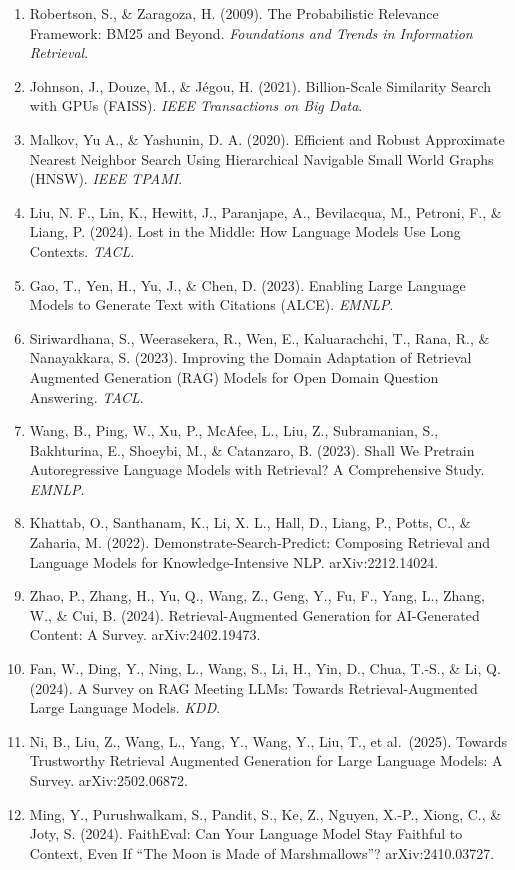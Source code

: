 \begin{enumerate}
\item
  Robertson, S., \& Zaragoza, H. (2009). The Probabilistic Relevance Framework: BM25 and Beyond. \emph{Foundations and Trends in Information Retrieval}.
\item
  Johnson, J., Douze, M., \& Jégou, H. (2021). Billion-Scale Similarity Search with GPUs (FAISS). \emph{IEEE Transactions on Big Data}.
\item
  Malkov, Yu A., \& Yashunin, D. A. (2020). Efficient and Robust Approximate Nearest Neighbor Search Using Hierarchical Navigable Small World Graphs (HNSW). \emph{IEEE TPAMI}.
\item
  Liu, N. F., Lin, K., Hewitt, J., Paranjape, A., Bevilacqua, M., Petroni, F., \& Liang, P. (2024). Lost in the Middle: How Language Models Use Long Contexts. \emph{TACL}.
\item
  Gao, T., Yen, H., Yu, J., \& Chen, D. (2023). Enabling Large Language Models to Generate Text with Citations (ALCE). \emph{EMNLP}.
\item
  Siriwardhana, S., Weerasekera, R., Wen, E., Kaluarachchi, T., Rana, R., \& Nanayakkara, S. (2023). Improving the Domain Adaptation of Retrieval Augmented Generation (RAG) Models for Open Domain Question Answering. \emph{TACL}.
\item
  Wang, B., Ping, W., Xu, P., McAfee, L., Liu, Z., Subramanian, S., Bakhturina, E., Shoeybi, M., \& Catanzaro, B. (2023). Shall We Pretrain Autoregressive Language Models with Retrieval? A Comprehensive Study. \emph{EMNLP}.
\item
  Khattab, O., Santhanam, K., Li, X. L., Hall, D., Liang, P., Potts, C., \& Zaharia, M. (2022). Demonstrate-Search-Predict: Composing Retrieval and Language Models for Knowledge-Intensive NLP. arXiv:2212.14024.
\item
  Zhao, P., Zhang, H., Yu, Q., Wang, Z., Geng, Y., Fu, F., Yang, L., Zhang, W., \& Cui, B. (2024). Retrieval-Augmented Generation for AI-Generated Content: A Survey. arXiv:2402.19473.
\item
  Fan, W., Ding, Y., Ning, L., Wang, S., Li, H., Yin, D., Chua, T.-S., \& Li, Q. (2024). A Survey on RAG Meeting LLMs: Towards Retrieval-Augmented Large Language Models. \emph{KDD}.
\item
  Ni, B., Liu, Z., Wang, L., Yang, Y., Wang, Y., Liu, T., et al.~(2025). Towards Trustworthy Retrieval Augmented Generation for Large Language Models: A Survey. arXiv:2502.06872.
\item
  Ming, Y., Purushwalkam, S., Pandit, S., Ke, Z., Nguyen, X.-P., Xiong, C., \& Joty, S. (2024). FaithEval: Can Your Language Model Stay Faithful to Context, Even If ``The Moon is Made of Marshmallows''? arXiv:2410.03727.

\end{enumerate}
